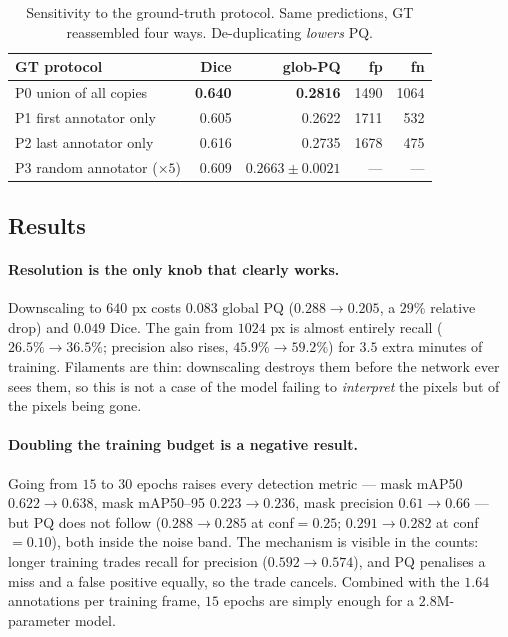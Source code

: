 \documentclass[sigconf]{acmart}
\providecommand{\Description}[1]{}
\begin{document}
\begin{table}[t]
\centering
\caption{Sensitivity to the ground-truth protocol. Same predictions, GT reassembled four ways. De-duplicating \emph{lowers} PQ.}
\Description{Table comparing four ground-truth protocols by Dice, PQ, and true positive, false positive and false negative counts.}
\label{tab:gt}
\small
\begin{tabular}{lrrrr}
\hline
\textbf{GT protocol} & \textbf{Dice} & \textbf{glob-PQ} & \textbf{fp} & \textbf{fn} \\
\hline
P0 union of all copies & \textbf{0.640} & \textbf{0.2816} & 1490 & 1064 \\
P1 first annotator only & 0.605 & 0.2622 & 1711 & 532 \\
P2 last annotator only & 0.616 & 0.2735 & 1678 & 475 \\
P3 random annotator ($\times5$) & 0.609 & $0.2663\pm0.0021$ & --- & --- \\
\hline
\end{tabular}
\end{table}

\subsection{Results}
\paragraph{Resolution is the only knob that clearly works.}
Downscaling to $640$ px costs $0.083$ global PQ ($0.288\to0.205$, a $29\%$ relative drop) and $0.049$ Dice. The gain from $1024$ px is almost entirely recall ($26.5\%\to36.5\%$; precision also rises, $45.9\%\to59.2\%$) for $3.5$ extra minutes of training. Filaments are thin: downscaling destroys them before the network ever sees them, so this is not a case of the model failing to \emph{interpret} the pixels but of the pixels being gone.

\paragraph{Doubling the training budget is a negative result.}
Going from $15$ to $30$ epochs raises every detection metric --- mask mAP50 $0.622\to0.638$, mask mAP50--95 $0.223\to0.236$, mask precision $0.61\to0.66$ --- but PQ does not follow ($0.288\to0.285$ at conf$=0.25$; $0.291\to0.282$ at conf$=0.10$), both inside the noise band. The mechanism is visible in the counts: longer training trades recall for precision ($0.592\to0.574$), and PQ penalises a miss and a false positive equally, so the trade cancels. Combined with the $1.64$ annotations per training frame, $15$ epochs are simply enough for a $2.8$M-parameter model.
\end{document}

